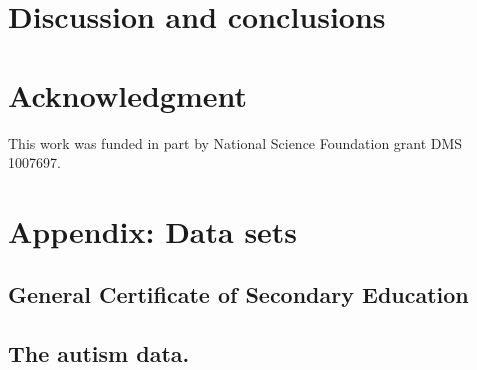 \documentclass{article} %
\begin{document}
\section{Discussion and conclusions}


\section{Acknowledgment}
This work was funded in part by National Science Foundation grant DMS 1007697.

\section{Appendix: Data sets}
\subsection{General Certificate of Secondary Education}\label{data:gcse}



\subsection{The autism data.}\label{data:autism}
\end{document}
